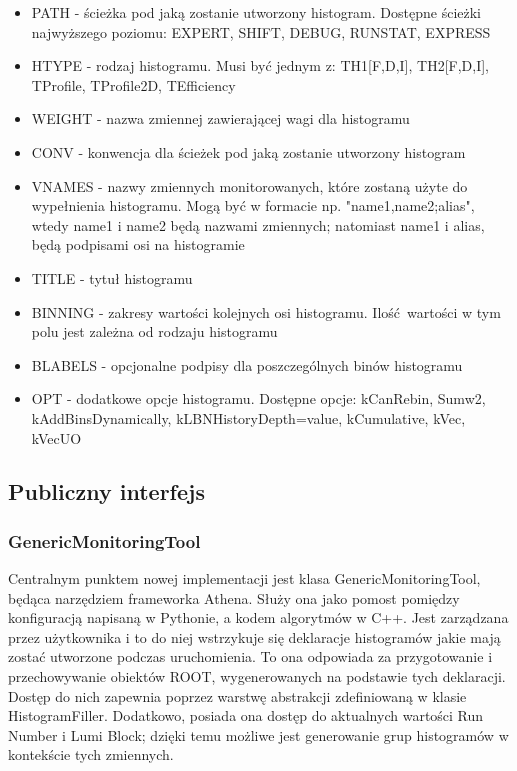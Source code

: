\begin{itemize}
\item PATH - ścieżka pod jaką zostanie utworzony histogram. Dostępne ścieżki najwyższego poziomu: EXPERT, SHIFT, DEBUG, RUNSTAT, EXPRESS
\item HTYPE - rodzaj histogramu. Musi być jednym z: TH1[F,D,I], TH2[F,D,I], TProfile, TProfile2D, TEfficiency
\item WEIGHT - nazwa zmiennej zawierającej wagi dla histogramu
\item CONV - konwencja dla ścieżek pod jaką zostanie utworzony histogram
\item VNAMES - nazwy zmiennych monitorowanych, które zostaną użyte do wypełnienia histogramu. Mogą być w formacie np. "name1,name2;alias", wtedy name1 i name2 będą nazwami zmiennych; natomiast name1 i alias, będą podpisami osi na histogramie
\item TITLE - tytuł histogramu
\item BINNING - zakresy wartości kolejnych osi histogramu. Ilość wartości w tym polu jest zależna od rodzaju histogramu
\item BLABELS - opcjonalne podpisy dla poszczególnych binów histogramu
\item OPT - dodatkowe opcje histogramu. Dostępne opcje: kCanRebin, Sumw2, kAddBinsDynamically, kLBNHistoryDepth=value, kCumulative, kVec, kVecUO
\end{itemize}

\subsection{Publiczny interfejs}

\subsubsection{GenericMonitoringTool}
Centralnym punktem nowej implementacji jest klasa GenericMonitoringTool, będąca narzędziem frameworka Athena.
Służy ona jako pomost pomiędzy konfiguracją napisaną w Pythonie, a kodem algorytmów w C++.
Jest zarządzana przez użytkownika i to do niej wstrzykuje się deklaracje histogramów jakie mają zostać utworzone podczas uruchomienia.
To ona odpowiada za przygotowanie i przechowywanie obiektów ROOT, wygenerowanych na podstawie tych deklaracji.
Dostęp do nich zapewnia poprzez warstwę abstrakcji zdefiniowaną w klasie HistogramFiller. 
Dodatkowo, posiada ona dostęp do aktualnych wartości Run Number i Lumi Block; dzięki temu możliwe jest generowanie grup histogramów w kontekście tych zmiennych. 
 
